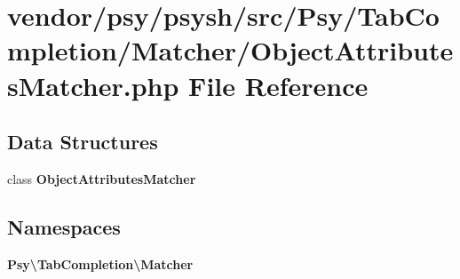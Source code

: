 \section{vendor/psy/psysh/src/\+Psy/\+Tab\+Completion/\+Matcher/\+Object\+Attributes\+Matcher.php File Reference}
\label{_object_attributes_matcher_8php}
\subsection*{Data Structures}
\begin{DoxyCompactItemize}
\item 
class {\bf Object\+Attributes\+Matcher}
\end{DoxyCompactItemize}
\subsection*{Namespaces}
\begin{DoxyCompactItemize}
\item 
 {\bf Psy\textbackslash{}\+Tab\+Completion\textbackslash{}\+Matcher}
\end{DoxyCompactItemize}
